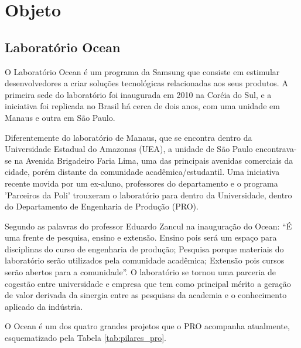\chapter{Objeto}

\section{Laboratório Ocean}

O Laboratório Ocean é um programa da Samsung que consiste em estimular desenvolvedores a criar soluções tecnológicas relacionadas aos seus produtos. A primeira sede do laboratório foi inaugurada em 2010 na Coréia do Sul, e a iniciativa foi replicada no Brasil há cerca de dois anos, com uma unidade em Manaus e outra em São Paulo.

Diferentemente do laboratório de Manaus, que se encontra dentro da Universidade Estadual do Amazonas (UEA), a unidade de São Paulo encontrava-se na Avenida Brigadeiro Faria Lima, uma das principais avenidas comerciais da cidade, porém distante da comunidade acadêmica/estudantil. Uma iniciativa recente movida por um ex-aluno, professores do departamento e o programa 'Parceiros da Poli' trouxeram o laboratório para dentro da Universidade, dentro do Departamento de Engenharia de Produção (PRO).

Segundo as palavras do professor Eduardo Zancul na inauguração do Ocean: “É uma frente de pesquisa, ensino e extensão. Ensino pois será um espaço para disciplinas do curso de engenharia de produção; Pesquisa porque materiais do laboratório serão utilizados pela comunidade acadêmica; Extensão pois cursos serão abertos para a comunidade”. O laboratório se tornou uma parceria de cogestão entre universidade e empresa que tem como principal mérito a geração de valor derivada da sinergia entre as pesquisas da academia e o conhecimento aplicado da indústria. 

O Ocean é um dos quatro grandes projetos que o PRO acompanha atualmente, esquematizado pela Tabela \ref{tab:pilares_pro}.

